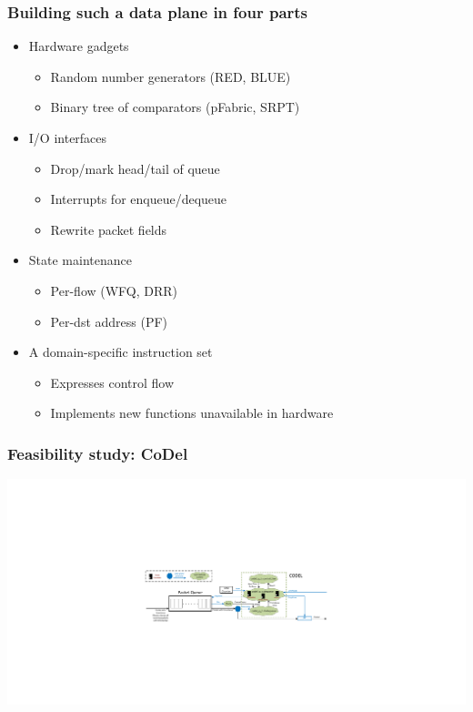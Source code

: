 \begin{Large}
\begin{frame}[plain]
\frametitle{Building such a data plane in four parts}
\begin{itemize}
\item Hardware gadgets
      \begin{itemize}
      \item Random number generators (RED, BLUE)
      \item Binary tree of comparators (pFabric, SRPT)
      \end{itemize}

\item I/O interfaces
      \begin{itemize}
      \item Drop/mark head/tail of queue
      \item Interrupts for enqueue/dequeue
      \item Rewrite packet fields
      \end{itemize}

\item State maintenance
      \begin{itemize}
      \item Per-flow (WFQ, DRR)
      \item Per-dst address (PF)
      \end{itemize}

\item A domain-specific instruction set
      \begin{itemize}
      \item Expresses control flow
      \item Implements new functions unavailable in hardware
      \end{itemize}
\end{itemize}
\end{frame}

\begin{frame}[plain]
\frametitle{Feasibility study: CoDel}
\begin{center}
\includegraphics[width=\columnwidth]{codel.pdf}
\end{center}
\end{frame}


\end{Large}
